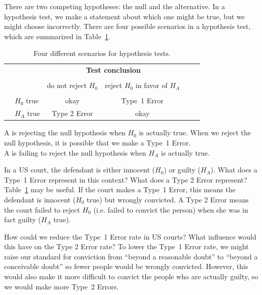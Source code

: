 There are two competing hypotheses: the null and the alternative. In a hypothesis test, we make a statement about which one might be true, but we might choose incorrectly. There are four possible scenarios in a hypothesis test, which are summarized in Table~\ref{fourHTScenarios}.

\begin{table}[ht]
\centering
\begin{tabular}{l l c c c}
& & \multicolumn{2}{c}{\textbf{Test conclusion}} \\
  \cline{3-4}
\vspace{-3.7mm} \\
& & do not reject $H_0$ &  reject $H_0$ in favor of $H_A$ &
\ \hspace{7mm} \  \\
  \cline{2-4}
\vspace{-3.7mm} \\
& $H_0$ true & okay &  Type~1 Error \\
\raisebox{1.5ex}{\textbf{Truth}} & $H_A$ true & Type 2 Error & okay \\
  \cline{2-4}
\end{tabular}
\caption{Four different scenarios for hypothesis tests.}
\label{fourHTScenarios}
\end{table}

\begin{termBox}{
A  is rejecting the null hypothesis when $H_0$ is actually true. When we reject the null hypothesis, it is possible that we make a Type~1 Error. \\[2mm]
A  is failing to reject the null hypothesis when $H_A$ is actually true.}
\end{termBox}



\begin{example}{In a US court, the defendant is either innocent ($H_0$) or guilty ($H_A$). What does a Type~1 Error represent in this context? What does a Type 2 Error represent? Table~\ref{fourHTScenarios} may be useful.}
If the court makes a Type~1 Error, this means the defendant is innocent ($H_0$ true) but wrongly convicted. A Type 2 Error means the court failed to reject $H_0$ (i.e. failed to convict the person) when she was in fact guilty ($H_A$ true).
\end{example}

\begin{example}{How could we reduce the Type~1 Error rate in US courts? What influence would this have on the Type 2 Error rate?}
To lower the Type~1 Error rate, we might raise our standard for conviction from ``beyond a reasonable doubt'' to ``beyond a conceivable doubt'' so fewer people would be wrongly convicted. However, this would also make it more difficult to convict the people who are actually guilty, so we would make more Type~2 Errors.
\end{example}

